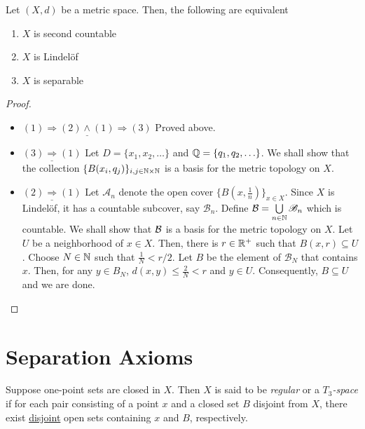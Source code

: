 \begin{theorem}
    Let $(X,d)$ be a metric space. Then, the following are equivalent
    \begin{enumerate}
        \item $X$ is second countable 
        \item $X$ is Lindel\"of
        \item $X$ is separable
    \end{enumerate}
\end{theorem}
\begin{proof}
\hfill 
\begin{itemize}
    \item \noindent$\underline{(1)\Longrightarrow(2)\wedge(1)\Longrightarrow(3)}$ Proved above.

    \item \noindent$\underline{(3)\Longrightarrow(1)}$ Let $D = \{x_1,x_2,\ldots\}$ and $\mathbb{Q} = \{q_1,q_2,\ldots\}$. We shall show that the collection $\{B(x_i, q_j)\}_{i,j\in\mathbb{N}\times\mathbb{N}}$ is a basis for the metric topology on $X$.

    \item \noindent$\underline{(2)\Longrightarrow(1)}$ Let $\mathscr A_n$ denote the open cover $\{B(x,\frac{1}{n})\}_{x\in X}$. Since $X$ is Lindel\"of, it has a countable subcover, say $\mathscr B_n$. Define $\mathcal{B} = \bigcup\limits_{n\in\mathbb{N}}\mathscr B_n$ which is countable. We shall show that $\mathcal{B}$ is a basis for the metric topology on $X$. Let $U$ be a neighborhood of $x\in X$. Then, there is $r\in\mathbb{R}^+$ such that $B(x,r)\subseteq U$. Choose $N\in\mathbb{N}$ such that $\frac{1}{N} < r/2$. Let $B$ be the element of $\mathscr B_N$ that contains $x$. Then, for any $y\in B_N$, $d(x,y)\le\frac{2}{N} < r$ and $y\in U$. Consequently, $B\subseteq U$ and we are done.
\end{itemize}
\end{proof}

\section{Separation Axioms}

\begin{definition}
    Suppose one-point sets are closed in $X$. Then $X$ is said to be \textit{regular} or a \textit{$T_3$-space} if for each pair consisting of a point $x$ and a closed set $B$ disjoint from $X$, there exist \underline{disjoint} open sets containing $x$ and $B$, respectively.
\end{definition}

